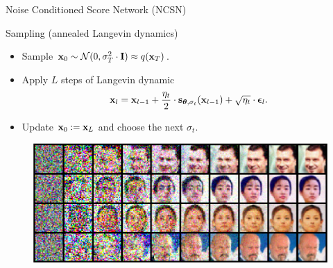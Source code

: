 \begin{frame}{Noise Conditioned Score Network (NCSN)}
	\begin{block}{Sampling (annealed Langevin dynamics)}
		\begin{itemize}
			\item Sample $\mathbf{x}_0 \sim \mathcal{N}(0, \sigma_T^2 \cdot \mathbf{I}) \approx q(\mathbf{x}_T)$.
			\item Apply $L$ steps of Langevin dynamic
			\vspace{-0.2cm}
			\[
				\mathbf{x}_l = \mathbf{x}_{l-1} + \frac{\eta_t}{2} \cdot \mathbf{s}_{\boldsymbol{\theta}, \sigma_t}(\mathbf{x}_{l - 1}) + \sqrt{\eta_t} \cdot \boldsymbol{\epsilon}_l.
			\] 
			\vspace{-0.5cm}
			\item Update $\mathbf{x}_0 := \mathbf{x}_L$ and choose the next $\sigma_t$.
		\end{itemize}
	\end{block}
	\begin{figure}
		\includegraphics[width=0.9\linewidth]{figs/ald}
	\end{figure}
\end{frame}
